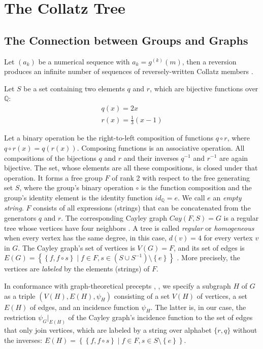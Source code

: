 \chapter{The Collatz Tree}

\section{The Connection between Groups and Graphs}
\label{sec:groups_graphs}
Let $(a_k)$ be a numerical sequence with $a_k=g^{(k)}(m)$, then a reversion produces an infinite number of sequences of reversely-written Collatz members \cite{Ref_Klisse_2010}.

\par\medskip
Let $S$ be a set containing two elements $q$ and $r$, which are bijective 
functions over $\mathbb{Q}$:
\begin{equation}
\begin{array}{l}
q(x)=2x \\ 
r(x)=\frac{1}{3}(x-1)
\end{array}
\end{equation}

Let a binary operation be the right-to-left composition of functions
$q\circ r$, where $q\circ r(x)=q(r(x))$. Composing functions is an
associative operation. All compositions of the bijections $q$ and $r$
and their inverses $q^{-1}$ and $r^{-1}$ are again bijective. The set,
whose elements are all these compositions, is closed under that operation.
It forms a free group $F$ of rank 2 with respect to the free generating set $S$, where the group's binary operation $\circ$ is the function composition and the group's identity element is the identity function $id_{\mathbb{Q}}=e$. We call $e$ an \textit{empty string}. $F$ consists of all expressions (strings) that can be concatenated from the generators $q$ and $r$. The corresponding Cayley graph $Cay(F,S)=G$ is a regular tree whose vertices have four neighbors \cite[p.~66]{Ref_Loeh}. A tree is called \textit{regular} or \textit{homogeneous} when every vertex has the same degree, in this case, $d(v)=4$ for every vertex $v$ in $G$. The Cayley graph's set of vertices is $V(G)=F$, and its set of edges is $E(G)=\left\{\left\{f,f\circ s\right\}\mid f\in F,s\in\left(S\cup S^{-1}\right)\setminus\left\{e\right\}\right\}$ \cite[p.~57]{Ref_Loeh}. More precisely, the vertices are \textit{labeled} by the elements (strings) of $F$.

\par\medskip
In conformance with graph-theoretical precepts \cite{Ref_Bondy_Murty},
\cite{Ref_Bonnington_Little}, \cite{Ref_Bender_Williamson}
we specify a subgraph $H$ of $G$ as a triple
$\left(V(H),E(H),\psi_{H}\right)$ consisting of a set $V(H)$ of vertices,
a set $E(H)$ of edges, and an incidence function $\psi_{H}$. The latter
is, in our case, the restriction $\psi_{G}\vert_{E(H)}$ of the Cayley
graph's incidence function to the set of edges that only join vertices,
which are labeled by a string over alphabet $\{r,q\}$ without the inverses:
$E(H)=\left\{\left\{f,f\circ s\right\}\mid f\in F,s\in S\setminus\left\{e
\right\}\right\}$.

